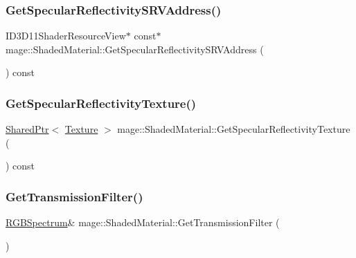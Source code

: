 \subsubsection{\texorpdfstring{Get\+Specular\+Reflectivity\+S\+R\+V\+Address()}{GetSpecularReflectivitySRVAddress()}}
{\footnotesize\ttfamily I\+D3\+D11\+Shader\+Resource\+View$\ast$ const$\ast$ mage\+::\+Shaded\+Material\+::\+Get\+Specular\+Reflectivity\+S\+R\+V\+Address (\begin{DoxyParamCaption}{ }\end{DoxyParamCaption}) const\hspace{0.3cm}{\ttfamily [noexcept]}}

\hypertarget{structmage_1_1_shaded_material_aabf7fea125dfdf4d97537f22e0003a9e}{}\label{structmage_1_1_shaded_material_aabf7fea125dfdf4d97537f22e0003a9e} 
\subsubsection{\texorpdfstring{Get\+Specular\+Reflectivity\+Texture()}{GetSpecularReflectivityTexture()}}
{\footnotesize\ttfamily \hyperlink{namespacemage_a1e01ae66713838a7a67d30e44c67703e}{Shared\+Ptr}$<$ \hyperlink{classmage_1_1_texture}{Texture} $>$ mage\+::\+Shaded\+Material\+::\+Get\+Specular\+Reflectivity\+Texture (\begin{DoxyParamCaption}{ }\end{DoxyParamCaption}) const\hspace{0.3cm}{\ttfamily [noexcept]}}

\hypertarget{structmage_1_1_shaded_material_a6f7957db6f13954152ffb9b71644fe80}{}\label{structmage_1_1_shaded_material_a6f7957db6f13954152ffb9b71644fe80} 
\subsubsection{\texorpdfstring{Get\+Transmission\+Filter()}{GetTransmissionFilter()}\hspace{0.1cm}{\footnotesize\ttfamily [1/2]}}
{\footnotesize\ttfamily \hyperlink{structmage_1_1_r_g_b_spectrum}{R\+G\+B\+Spectrum}\& mage\+::\+Shaded\+Material\+::\+Get\+Transmission\+Filter (\begin{DoxyParamCaption}{ }\end{DoxyParamCaption})\hspace{0.3cm}{\ttfamily [noexcept]}}


